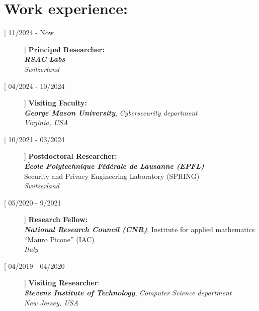 \documentclass[margin, 10pt]{article} %
\begin{document}
\noindent\makebox[\linewidth]{\rule{.8\paperwidth}{0.3pt}}


\section*{Work experience:} 

\begin{description}
	
\item[[ {11/2024 - Now}]] \textbf{Principal Researcher}\textbf{:}\\
 \textbf{\textit{RSAC Labs}}\\
 \textit{Switzerland}

\item[[ {04/2024 - 10/2024}]] \textbf{Visiting Faculty:}\\
 \textbf{\textit{George Mason University}},  \textit{Cybersecurity department}\\
 \textit{Virginia, USA}

\item[[ {10/2021 - 03/2024}]] \textbf{Postdoctoral Researcher:}\\
 \textbf{\textit{École Polytechnique Fédérale de Lausanne (EPFL)}}\\ 
Security and Privacy Engineering Laboratory (SPRING)\\
\textit{Switzerland}
\item[[ 05/2020 - 9/2021]] \textbf{Research Fellow:}\\
 \textbf{\textit{National Research Council (CNR)}}, 
Institute for applied mathematics ``Mauro Picone'' (IAC)\\
\textit{Italy}
\item[[ 04/2019 - 04/2020]] \textbf{Visiting Researcher}:\\
 \textbf{\textit{Stevens Institute of Technology}}, \textit{Computer Science department}\\ 
\textit{New Jersey, USA}
	

\end{description}
\end{document}
